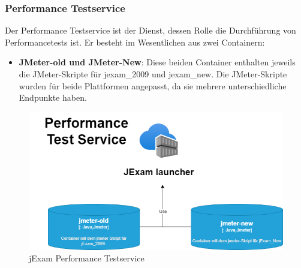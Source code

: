 \subsubsection{Performance Testservice}

Der Performance Testservice ist der Dienst, dessen Rolle die
Durchführung von Performancetests ist. Er besteht im Wesentlichen
aus zwei Containern:

\begin{itemize}
    \setlength\itemsep{1em}

    \item[] \textbf{JMeter-old und JMeter-New}: Diese beiden Container enthalten jeweils
    die JMeter-Skripte für \gls{jexam_2009} und \gls{jexam_new}. Die
    JMeter-Skripte wurden für beide Plattformen angepasst, da sie
    mehrere unterschiedliche Endpunkte haben.

\end{itemize}

\begin{figure}[H]
    \centering
    \includegraphics[scale=0.6]{images/performance.drawio}
    \caption{jExam Performance Testservice} \label{fig:per}
\end{figure}
